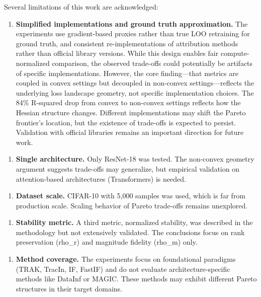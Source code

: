 Several limitations of this work are acknowledged:

\begin{enumerate}
\item \textbf{Simplified implementations and ground truth approximation.} The experiments use gradient-based proxies rather than true LOO retraining for ground truth, and consistent re-implementations of attribution methods rather than official library versions. While this design enables fair compute-normalized comparison, the observed trade-offs could potentially be artifacts of specific implementations. However, the core finding---that metrics are coupled in convex settings but decoupled in non-convex settings---reflects the underlying loss landscape geometry, not specific implementation choices. The 84\% R-squared drop from convex to non-convex settings reflects how the Hessian structure changes. Different implementations may shift the Pareto frontier's location, but the existence of trade-offs is expected to persist. Validation with official libraries remains an important direction for future work.
\end{enumerate}

\begin{enumerate}
\item \textbf{Single architecture.} Only ResNet-18 was tested. The non-convex geometry argument suggests trade-offs may generalize, but empirical validation on attention-based architectures (Transformers) is needed.
\end{enumerate}

\begin{enumerate}
\item \textbf{Dataset scale.} CIFAR-10 with 5,000 samples was used, which is far from production scale. Scaling behavior of Pareto trade-offs remains unexplored.
\end{enumerate}

\begin{enumerate}
\item \textbf{Stability metric.} A third metric, normalized stability, was described in the methodology but not extensively validated. The conclusions focus on rank preservation (rho\_r) and magnitude fidelity (rho\_m) only.
\end{enumerate}

\begin{enumerate}
\item \textbf{Method coverage.} The experiments focus on foundational paradigms (TRAK, TracIn, IF, FastIF) and do not evaluate architecture-specific methods like DataInf or MAGIC. These methods may exhibit different Pareto structures in their target domains.
\end{enumerate}

